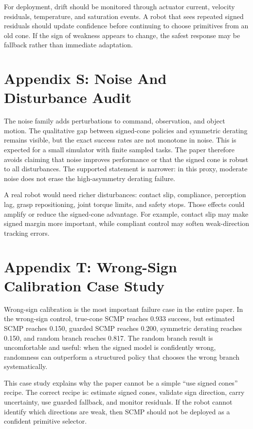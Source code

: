 \documentclass{article}
\begin{document}
For deployment, drift should be monitored through actuator current, velocity residuals, temperature, and saturation events. A robot that sees repeated signed residuals should update confidence before continuing to choose primitives from an old cone. If the sign of weakness appears to change, the safest response may be fallback rather than immediate adaptation.

\section{Appendix S: Noise And Disturbance Audit}

The noise family adds perturbations to command, observation, and object motion. The qualitative gap between signed-cone policies and symmetric derating remains visible, but the exact success rates are not monotone in noise. This is expected for a small simulator with finite sampled tasks. The paper therefore avoids claiming that noise improves performance or that the signed cone is robust to all disturbances. The supported statement is narrower: in this proxy, moderate noise does not erase the high-asymmetry derating failure.

A real robot would need richer disturbances: contact slip, compliance, perception lag, grasp repositioning, joint torque limits, and safety stops. Those effects could amplify or reduce the signed-cone advantage. For example, contact slip may make signed margin more important, while compliant control may soften weak-direction tracking errors.

\section{Appendix T: Wrong-Sign Calibration Case Study}

Wrong-sign calibration is the most important failure case in the entire paper. In the wrong-sign control, true-cone SCMP reaches 0.933 success, but estimated SCMP reaches 0.150, guarded SCMP reaches 0.200, symmetric derating reaches 0.150, and random branch reaches 0.817. The random branch result is uncomfortable and useful: when the signed model is confidently wrong, randomness can outperform a structured policy that chooses the wrong branch systematically.

This case study explains why the paper cannot be a simple ``use signed cones'' recipe. The correct recipe is: estimate signed cones, validate sign direction, carry uncertainty, use guarded fallback, and monitor residuals. If the robot cannot identify which directions are weak, then SCMP should not be deployed as a confident primitive selector.
\end{document}
